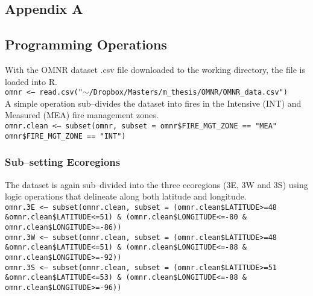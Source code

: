 \begin{spacing}{1.5}
\phantom
\phantom
\phantom
\phantom
\section{Appendix A}
\phantom
\phantom
\subsection{Programming Operations}
With the OMNR dataset .csv file downloaded to the working directory, the file is loaded into R.\\

\noindent \texttt{omnr <-- read.csv("$\sim$/Dropbox/Masters/m\_thesis/OMNR/OMNR\_data.csv")} \\

\noindent A simple operation sub--divides the dataset into fires in the Intensive (INT) and Measured (MEA) fire management zones. \\

\noindent \texttt{omnr.clean <-- subset(omnr, subset = omnr\$FIRE\_MGT\_ZONE == "MEA" \textbar \linebreak omnr\$FIRE\_MGT\_ZONE == "INT")}

\subsubsection{Sub--setting Ecoregions}
The dataset is again sub--divided into the three ecoregions (3E, 3W and 3S) using logic operations that delineate along both latitude and longitude. \\

\noindent \texttt{omnr.3E <-- subset(omnr.clean, subset = (omnr.clean\$LATITUDE>=48 \&\linebreak omnr.clean\$LATITUDE<=51) \& (omnr.clean\$LONGITUDE<=-80 \& omnr.clean\$\linebreak LONGITUDE>=-86))} \\

\noindent \texttt{omnr.3W <-- subset(omnr.clean, subset = (omnr.clean\$LATITUDE>=48 \&\linebreak omnr.clean\$LATITUDE<=51) \& (omnr.clean\$LONGITUDE<=-88 \& omnr.clean\$\linebreak LONGITUDE>=-92)) }\\

\noindent \texttt{omnr.3S <-- subset(omnr.clean, subset = (omnr.clean\$LATITUDE>=51 \&\linebreak omnr.clean\$LATITUDE<=53) \& (omnr.clean\$LONGITUDE<=-88 \& omnr.clean\$\linebreak LONGITUDE>=-96)) }\\


\end{spacing}
